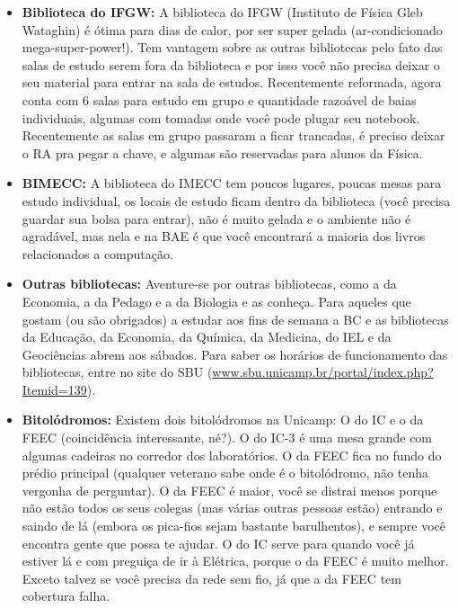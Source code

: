 \begin{itemize}
    \item  \textbf{Biblioteca do IFGW:} A biblioteca do IFGW (Instituto de
        Física Gleb Wataghin) é ótima para dias de calor, por ser super gelada
        (ar-condicionado mega-super-power!). Tem vantagem sobre as outras
        bibliotecas pelo fato das salas de estudo serem fora da biblioteca e por
        isso você não precisa deixar o seu material para entrar na sala de
        estudos. Recentemente reformada, agora conta com 6 salas para estudo em
        grupo e quantidade razoável de baias individuais, algumas com tomadas
        onde você pode plugar seu notebook. Recentemente as salas em grupo
        passaram a ficar trancadas, é preciso deixar o RA pra pegar a chave, e
        algumas são reservadas para alunos da Física.

    \item  \textbf{BIMECC:} A biblioteca do IMECC tem poucos lugares, poucas
        mesas para estudo individual, os locais de estudo ficam dentro da
        biblioteca (você precisa guardar sua bolsa para entrar), não é muito
        gelada e o ambiente não é agradável, mas nela e na BAE é que você
        encontrará a maioria dos livros relacionados a computação.

    \item  \textbf{Outras bibliotecas:} Aventure-se por outras bibliotecas, como
        a da Economia, a da Pedago e a da Biologia e as conheça. Para aqueles
        que gostam (ou são obrigados) a estudar aos fins de semana a BC e as
        bibliotecas da Educação, da Economia, da Química, da Medicina, do IEL e
        da Geociências abrem aos sábados. Para saber os horários de
        funcionamento das bibliotecas, entre no site do SBU
        (\url{www.sbu.unicamp.br/portal/index.php?Itemid=139}).

    \item  \textbf{Bitolódromos:} Existem dois bitolódromos na Unicamp: O do IC
        e o da FEEC (coincidência interessante, né?). O do IC-3 é uma mesa
        grande com algumas cadeiras no corredor dos laboratórios. O da FEEC fica
        no fundo do prédio principal (qualquer veterano sabe onde é o
        bitolódromo, não tenha vergonha de perguntar). O da FEEC é maior, você
        se distrai menos porque não estão todos os seus colegas (mas várias
        outras pessoas estão) entrando e saindo de lá (embora os pica-fios sejam
        bastante barulhentos), e sempre você encontra gente que possa te ajudar.
        O do IC serve para quando você já estiver lá e com preguiça de ir à
        Elétrica, porque o da FEEC é muito melhor. Exceto talvez se você precisa
        da rede sem fio, já que a da FEEC tem cobertura falha.


\end{itemize}
